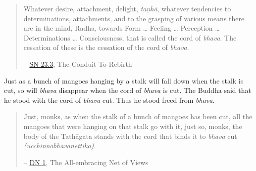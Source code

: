 \begin{quote}
Whatever desire, attachment, delight, \emph{taṇhā}, whatever tendencies to determinations, attachments, and to the grasping of various means there are in the mind, Radha, towards Form \ldots{} Feeling \ldots{} Perception \ldots{} Determinations \ldots{} Consciousness, that is called the cord of \emph{bhava}. The cessation of these is the cessation of the cord of \emph{bhava}.

 -- \href{https://suttacentral.net/sn23.3/en/sujato}{SN 23.3}, The Conduit To Rebirth
\end{quote}

Just as a bunch of mangoes hanging by a stalk will fall down when the stalk is cut, so will \emph{bhava} disappear when the cord of \emph{bhava} is cut. The Buddha said that he stood with the cord of \emph{bhava} cut. Thus he stood freed from \emph{bhava}.

\begin{quote}
Just, monks, as when the stalk of a bunch of mangoes has been cut, all the mangoes that were hanging on that stalk go with it, just so, monks, the body of the Tathāgata stands with the cord that binds it to \emph{bhava} cut \emph{(ucchinnabhavanettiko)}.

 -- \href{https://suttacentral.net/dn1/en/bodhi}{DN 1}, The All-embracing Net of Views
\end{quote}
